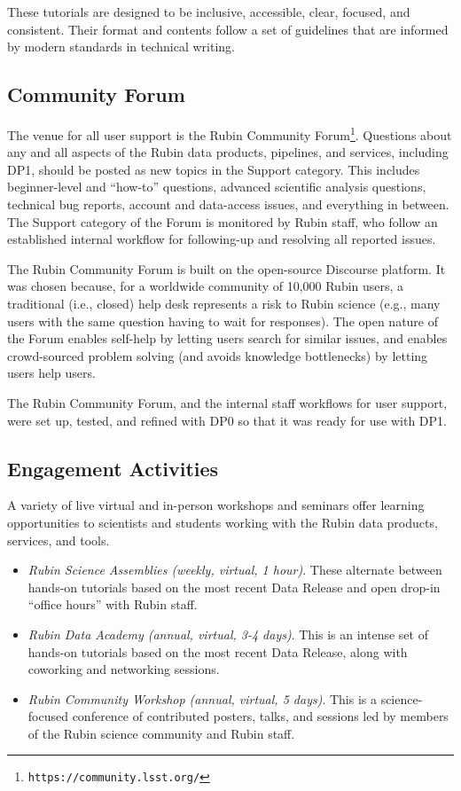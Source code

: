 These tutorials are designed to be inclusive, accessible, clear, focused, and consistent.
Their format and contents follow a set of guidelines \citep{RTN-045} that are informed by modern standards in technical writing.


\subsection{Community Forum}
\label{ssec:forum}

The venue for all user support is the Rubin Community Forum\footnote{\nolinkurl{https://community.lsst.org/}}. Questions about any and all aspects of the Rubin data products, pipelines, and services, including \gls{DP1}, should be posted as new topics in the Support category.
This includes beginner-level and ``how-to'' questions, advanced scientific analysis questions, technical bug reports, account and data-access issues, and everything in between.
The Support category of the Forum is monitored by Rubin staff, who follow an established internal workflow for following-up and resolving all reported issues.

The Rubin Community Forum is built on the open-source Discourse platform.
It was chosen because, for a worldwide community of 10,000 Rubin users, a traditional (i.e., closed) help desk represents a risk to Rubin science (e.g., many users with the same question having to wait for responses).
The open nature of the Forum enables self-help by letting users search for similar issues, and enables crowd-sourced problem solving (and avoids knowledge bottlenecks) by letting users help users.

The Rubin Community Forum, and the internal staff workflows for user support, were set up, tested, and refined with \gls{DP0} so that it was ready for use with \gls{DP1}.


\subsection{Engagement Activities}
\label{ssec:engagement}

A variety of live virtual and in-person workshops and seminars offer learning opportunities to scientists and students working with the Rubin data products, services, and tools.

\begin{itemize}
\item \textit{Rubin Science Assemblies (weekly, virtual, 1 hour)}. These alternate between hands-on tutorials based on the most recent Data Release and open drop-in ``office hours'' with Rubin staff.
\item \textit{Rubin Data Academy (annual, virtual, 3-4 days)}. This is an intense set of hands-on tutorials based on the most recent Data Release, along with coworking and networking sessions.
\item \textit{Rubin Community Workshop (annual, virtual, 5 days)}. This is a science-focused conference of contributed posters, talks, and sessions led by members of the Rubin science community and Rubin staff.
\end{itemize}

